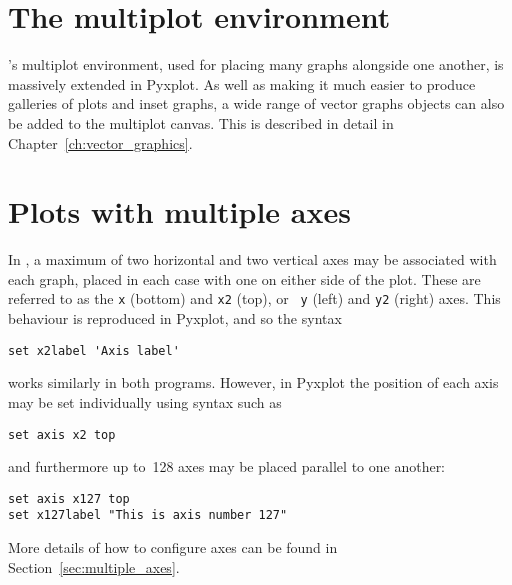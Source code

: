 \vspace{3mm}
\newline
{}
\vspace{3mm}\newline

\vspace{3mm}

\section{The multiplot environment}

\gnuplot's multiplot environment, used for placing many graphs alongside one
another, is massively extended in Pyxplot.  As well as making it much easier to
produce galleries of plots and inset graphs, a wide range of vector graphs
objects can also be added to the multiplot canvas. This is described in detail
in Chapter~\ref{ch:vector_graphics}.

\section{Plots with multiple axes}

In \gnuplot, a maximum of two horizontal and two vertical axes may be
associated with each graph, placed in each case with one on either side of the
plot. These are referred to as the {\tt x} (bottom) and {\tt x2} (top), or {\tt
y} (left) and {\tt y2} (right) axes.  This behaviour is reproduced in Pyxplot,
and so the syntax

\begin{verbatim}
set x2label 'Axis label'
\end{verbatim}

\noindent works similarly in both programs. However, in Pyxplot the position of
each axis may be set individually using syntax such as

\begin{verbatim}
set axis x2 top
\end{verbatim}

\noindent and furthermore up to~128 axes may be placed parallel to one another:

\begin{verbatim}
set axis x127 top
set x127label "This is axis number 127"
\end{verbatim}

\noindent More details of how to configure axes can be found in
Section~\ref{sec:multiple_axes}.

